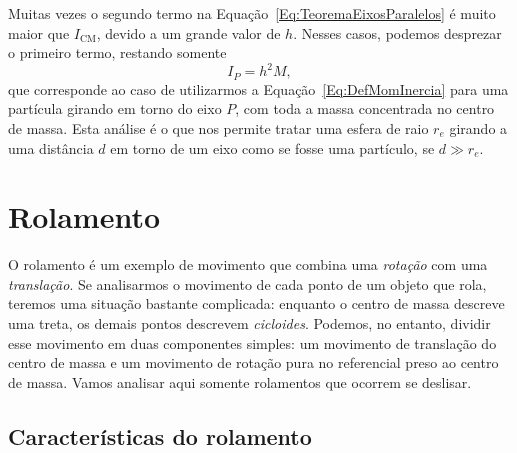 Muitas vezes o segundo termo na Equação~\eqref{Eq:TeoremaEixosParalelos} é muito maior que $I_{\textrm{CM}}$, devido a um grande valor de $h$. Nesses casos, podemos desprezar o primeiro termo, restando somente
\begin{equation}
  I_P = h^2 M,
\end{equation}
%
que corresponde ao caso de utilizarmos a Equação~\eqref{Eq:DefMomInercia} para uma partícula girando em torno do eixo $P$, com toda a massa concentrada no centro de massa. Esta análise é o que nos permite tratar uma esfera de raio $r_e$ girando a uma distância $d$ em torno de um eixo como se fosse uma partículo, se $d \gg r_e$.


\section{Rolamento}


O rolamento é um exemplo de movimento que combina uma \emph{rotação} com uma \emph{translação}. Se analisarmos o movimento de cada ponto de um objeto que rola, teremos uma situação bastante complicada: enquanto o centro de massa descreve uma treta, os demais pontos descrevem \emph{cicloides}. Podemos, no entanto, dividir esse movimento em duas componentes simples: um movimento de translação do centro de massa e um movimento de rotação pura no referencial preso ao centro de massa.
Vamos analisar aqui somente rolamentos que ocorrem se deslisar. 

\subsection{Características do rolamento}

